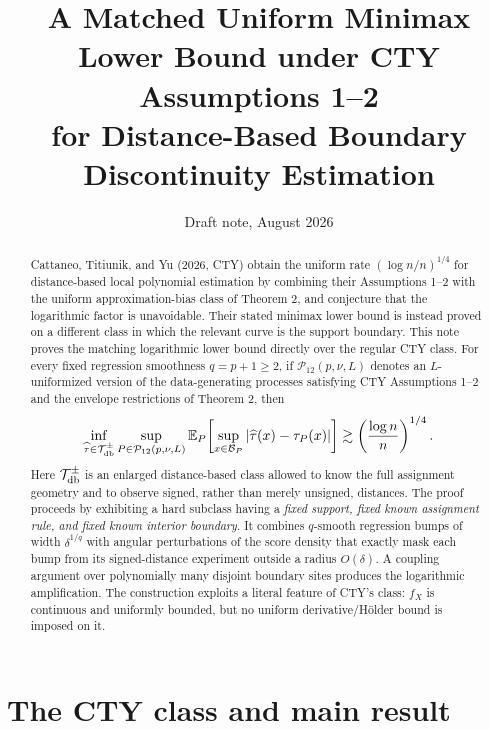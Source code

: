 \documentclass[11pt]{article}
\title{A Matched Uniform Minimax Lower Bound under CTY Assumptions 1--2\\for Distance-Based Boundary Discontinuity Estimation}
\author{}
\date{Draft note, August 2026}
\newcommand{\E}{\mathbb E}
\newcommand{\1}{\mathbf 1}
\begin{document}
\maketitle

\begin{abstract}
Cattaneo, Titiunik, and Yu (2026, CTY) obtain the uniform rate $(\log n/n)^{1/4}$ for distance-based local polynomial estimation by combining their Assumptions 1--2 with the uniform approximation-bias class of Theorem 2, and conjecture that the logarithmic factor is unavoidable. Their stated minimax lower bound is instead proved on a different class in which the relevant curve is the support boundary. This note proves the matching logarithmic lower bound directly over the regular CTY class. For every fixed regression smoothness $q=p+1\ge2$, if $\mathcal P_{12}(p,\nu,L)$ denotes an $L$-uniformized version of the data-generating processes satisfying CTY Assumptions 1--2 and the envelope restrictions of Theorem 2, then
\[
\inf_{\widehat\tau\in\mathcal T_{\rm db}^{\pm}}
\sup_{P\in\mathcal P_{12}(p,\nu,L)}
\E_P\!\left[\sup_{x\in\mathcal B_P}|\widehat\tau(x)-\tau_P(x)|\right]
\gtrsim \left(\frac{\log n}{n}\right)^{1/4}.
\]
Here $\mathcal T_{\rm db}^{\pm}$ is an enlarged distance-based class allowed to know the full assignment geometry and to observe signed, rather than merely unsigned, distances. The proof proceeds by exhibiting a hard subclass having a \emph{fixed support, fixed known assignment rule, and fixed known interior boundary}. It combines $q$-smooth regression bumps of width $\delta^{1/q}$ with angular perturbations of the score density that exactly mask each bump from its signed-distance experiment outside a radius $O(\delta)$. A coupling argument over polynomially many disjoint boundary sites produces the logarithmic amplification. The construction exploits a literal feature of CTY's class: $f_X$ is continuous and uniformly bounded, but no uniform derivative/H\"older bound is imposed on it.
\end{abstract}

\section{The CTY class and main result}
\end{document}
